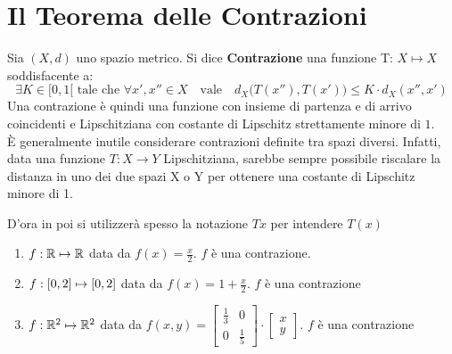 \section{Il Teorema delle Contrazioni}
\begin{definition}[Contrazione]
	\label{def:contrazione}
	Sia $(X, d)$ uno spazio metrico. Si dice \textbf{Contrazione} una funzione T: $X \mapsto X$ soddisfacente a:
	\begin{equation}
		\label{eq:def_contrazione}
		\exists K \in [0, 1[ \text{ tale che } \forall x',x'' \in X \quad \text{vale} \quad d_X \bigl( T(x''), T(x') \bigr) \leq K \cdot d_X(x'', x')
	\end{equation}
	Una contrazione è quindi una funzione con insieme di partenza e di arrivo coincidenti e Lipschitziana con costante di Lipschitz strettamente minore di $1$.\\
	È generalmente inutile considerare contrazioni definite tra spazi diversi. Infatti, data una funzione $T: X\rightarrow Y$ Lipschitziana, sarebbe sempre possibile riscalare la distanza in uno dei due spazi X o Y per ottenere una costante di Lipschitz minore di 1.
	\begin{note}
		D'ora in poi si utilizzerà spesso la notazione $Tx$ per intendere $T(x)$
	\end{note}
\end{definition}
\begin{example}\leavevmode\vspace*{-\baselineskip}
	\begin{enumerate}
		\item $f: \mathbb{R} \mapsto \mathbb{R}$ data da $f(x) = \frac{x}{2}$. $f$ è una contrazione.
		\item $f: \left[0,2\right] \mapsto \left[0,2\right]$ data da $f(x) = 1 + \frac{x}{2}$. $f$ è una contrazione
		\item $f: \mathbb{R}^2 \mapsto \mathbb{R}^2$ data da $f(x,y)=
			\begin{bmatrix}
				\frac{1}{3} & 0\\[1ex]
				0 & \frac{1}{5}
			\end{bmatrix} \cdot
			\begin{bmatrix}
				x\\[1ex]
				y
			\end{bmatrix}$. $f$ è una contrazione
	\end{enumerate}
\end{example}

